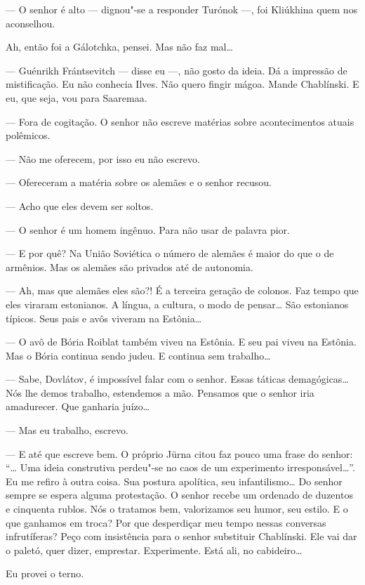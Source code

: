 --- O senhor é alto --- dignou"-se a responder Turónok ---, foi Kliúkhina
quem nos aconselhou.

Ah, então foi a Gálotchka, pensei. Mas não faz mal\ldots{}

--- Guénrikh Frántsevitch --- disse eu ---, não gosto da ideia. Dá a
impressão de mistificação. Eu não conhecia Ilves. Não quero fingir
mágoa. Mande Chablínski. E eu, que seja, vou para Saaremaa.

--- Fora de cogitação. O senhor não escreve matérias sobre
acontecimentos atuais polêmicos.

--- Não me oferecem, por isso eu não escrevo.

--- Ofereceram a matéria sobre os alemães e o senhor recusou.

--- Acho que eles devem ser soltos.

--- O senhor é um homem ingênuo. Para não usar de palavra pior.

--- E por quê? Na União Soviética o número de alemães é maior do que o
de armênios. Mas os alemães são privados até de autonomia.

--- Ah, mas que alemães eles são?! É a terceira geração de colonos. Faz
tempo que eles viraram estonianos. A língua, a cultura, o modo de
pensar\ldots{} São estonianos típicos. Seus pais e avôs viveram na Estônia\ldots{}

--- O avô de Bória Roiblat também viveu na Estônia. E seu pai viveu na
Estônia. Mas o Bória continua sendo judeu. E continua sem trabalho\ldots{}

--- Sabe, Dovlátov, é impossível falar com o senhor. Essas táticas
demagógicas\ldots{} Nós lhe demos trabalho, estendemos a mão. Pensamos que o
senhor iria amadurecer. Que ganharia juízo\ldots{}

--- Mas eu trabalho, escrevo.

--- E até que escreve bem. O próprio Jürna citou faz pouco uma frase do
senhor: ``\ldots{} Uma ideia construtiva perdeu"-se no caos de um experimento
irresponsável\ldots{}''. Eu me refiro à outra coisa. Sua postura apolítica,
seu infantilismo\ldots{} Do senhor sempre se espera alguma protestação. O senhor
recebe um ordenado de duzentos e cinquenta rublos. Nós o tratamos bem,
valorizamos seu humor, seu estilo. E o que ganhamos em troca? Por que
desperdiçar meu tempo nessas conversas infrutíferas? Peço com
insistência para o senhor substituir Chablínski. Ele vai dar o paletó,
quer dizer, emprestar. Experimente. Está ali, no cabideiro\ldots{}

Eu provei o terno.

